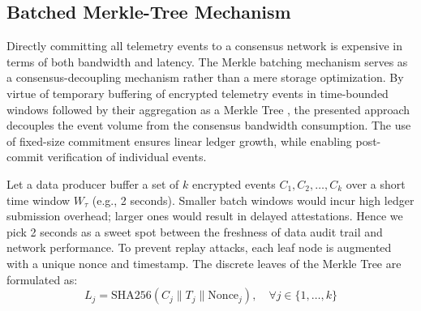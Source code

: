 \documentclass[conference]{IEEEtran}
\begin{document}
\subsection{Batched Merkle-Tree Mechanism}

Directly committing all telemetry events to a consensus network is expensive in terms of both bandwidth and latency. The Merkle batching mechanism serves as a consensus-decoupling mechanism rather than a mere storage optimization. By virtue of temporary buffering of encrypted telemetry events in time-bounded windows followed by their aggregation as a Merkle Tree \cite{b6, b28}, the presented approach decouples the event volume from the consensus bandwidth consumption. The use of fixed-size commitment ensures linear ledger growth, while enabling post-commit verification of individual events.

Let a data producer buffer a set of $k$ encrypted events $C_1, C_2, \dots, C_k$ over a short time window $W_\tau$ (e.g., 2 seconds). Smaller batch windows would incur high ledger submission overhead; larger ones would result in delayed attestations. Hence we pick 2 seconds as a sweet spot between the freshness of data audit trail and network performance. To prevent replay attacks, each leaf node is augmented with a unique nonce and timestamp. The discrete leaves of the Merkle Tree are formulated as:
\begin{equation}
L_j = \text{SHA256}(C_j \parallel T_j \parallel \text{Nonce}_j), \quad \forall j \in \{1, \dots, k\}
\end{equation}

\end{document}
